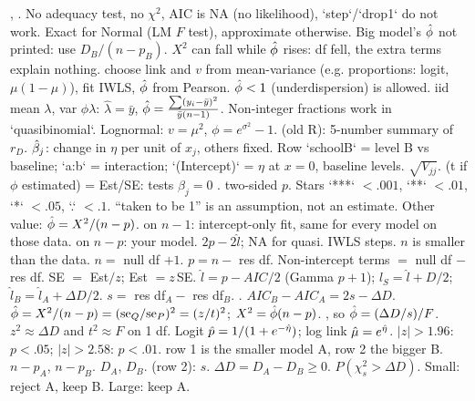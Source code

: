 \sk{} , . No adequacy test, no $\chi^2$, AIC is NA (no likelihood), `step`/`drop1` do not work. Exact for Normal (LM $F$ test), approximate otherwise. Big model's $\hat{\phi}$ not printed: use $D_B/(n-p_B)$. $X^2$ can fall while $\hat{\phi}$ rises: df fell, the extra terms explain nothing.
\sk{} choose link and $v$ from mean-variance (e.g. proportions: logit, $\mu(1-\mu)$), fit IWLS, $\hat{\phi}$ from Pearson. $\hat{\phi}<1$ (underdispersion) is allowed. iid mean $\lambda$, var $\phi\lambda$: $\hat\lambda=\bar y$, $\hat{\phi}=\frac{\sum(y_i-\bar y)^2}{\bar y(n-1)}$. Non-integer fractions work in `quasibinomial`. Lognormal: $v=\mu^2$, $\phi=e^{\sigma^2}-1$.
\li{} (old R): 5-number summary of $r_D$.
\li{} $\hat{\beta}_j$: change in $\eta$ per unit of $x_j$, others fixed. Row `schoolB` = level B vs baseline; `a:b` = interaction; `(Intercept)` = $\eta$ at $x=0$, baseline levels.  $\sqrt{V_{jj}}$.
\li{} (t if $\phi$ estimated) = Est/SE: tests $\beta_j=0$ .  two-sided $p$. Stars `***` $<.001$, `**` $<.01$, `*` $<.05$, `.` $<.1$.
\li{} “taken to be 1” is an assumption, not an estimate. Other value: $\hat{\phi}=X^2/(n-p)$.
\li{} on $n-1$: intercept-only fit, same for every model on those data.  on $n-p$: your model.
\li{} $2p-2\hat l$; NA for quasi.  IWLS steps.  $n$ is smaller than the data.
\bx
{} $n=$ null df $+1$. $p=n-$ res df. Non-intercept terms $=$ null df $-$ res df. SE $=$ Est$/z$; Est $=z\,$SE. $\hat l=p-AIC/2$ (Gamma $p+1$); $l_S=\hat l+D/2$; $\hat l_B=\hat l_A+\Delta D/2$. $s=$ res df$_A-$ res df$_B$. . $AIC_B-AIC_A=2s-\Delta D$. $\hat{\phi}=X^2/(n-p)=(\mathrm{se}_Q/\mathrm{se}_P)^2=(z/t)^2$; $X^2=\hat{\phi}(n-p)$. , so $\hat{\phi}=(\Delta D/s)/F$. $z^2\approx\Delta D$ and $t^2\approx F$ on 1 df. Logit $\hat p=1/(1+e^{-\hat{\eta}})$; log link $\hat{\mu}=e^{\hat{\eta}}$. $|z|>1.96$: $p<.05$; $|z|>2.58$: $p<.01$.
\bx
{} row 1 is the smaller model A, row 2 the bigger B.
\li{} $n-p_A$, $n-p_B$.  $D_A$, $D_B$.
\li{} (row 2): $s$.  $\Delta D=D_A-D_B\ge0$.
\li{} $P(\chi^2_s>\Delta D)$. Small: reject A, keep B. Large: keep A.
